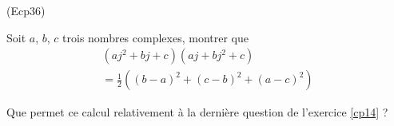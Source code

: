 \begin{tiny}(Ecp36)\end{tiny} Soit $a$, $b$, $c$ trois nombres complexes, montrer que
\begin{multline*}
  (aj^2+bj+c)(aj+bj^2+c) \\=
  \frac{1}{2}\left( (b-a)^2+(c-b)^2+(a-c)^2\right) 
\end{multline*}

Que permet ce calcul relativement à la dernière question de l'exercice \ref{cp14} ?
